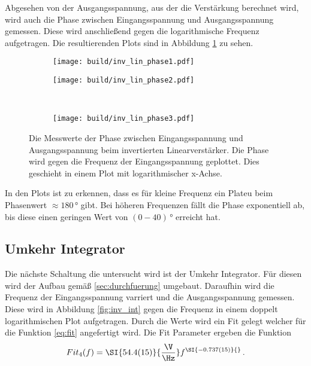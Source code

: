 Abgesehen von der Ausgangsspannung, aus der die Verstärkung berechnet wird, wird auch die Phase zwischen Eingangsspannung und Ausgangsspannung gemessen.
Diese wird anschließend gegen die logarithmische  Frequenz aufgetragen.
Die resultierenden Plots sind in Abbildung \ref{fig:phase} zu sehen.
\begin{figure}
    \centering
    \begin{subfigure}{0.49\linewidth}%
        \texttt{[image: build/inv\_lin\_phase1.pdf]}
    \end{subfigure}
    \hfill
    \begin{subfigure}{0.49\linewidth}%
        \texttt{[image: build/inv\_lin\_phase2.pdf]}
    \end{subfigure}\\
    \begin{subfigure}{0.49\linewidth}%
        \texttt{[image: build/inv\_lin\_phase3.pdf]}
    \end{subfigure}
    \caption{Die Messwerte der Phase zwischen Eingangsspannung und Ausgangsspannung beim invertierten Linearverstärker. Die Phase wird gegen die Frequenz der Eingangsspannung geplottet.
    Dies geschieht in einem Plot mit logarithmischer x-Achse.}
    \label{fig:phase}
\end{figure}
In den Plots ist zu erkennen, dass es für kleine Frequenz ein Plateu beim Phasenwert $\approx 180\,\si{\degree}$ gibt.
Bei höheren Frequenzen fällt die Phase exponentiell ab, bis diese einen geringen Wert von $(0-40)\,\si{\degree}$ erreicht hat.
\FloatBarrier
\subsection{Umkehr Integrator}
Die nächste Schaltung die untersucht wird ist der Umkehr Integrator.
Für diesen wird der Aufbau gemäß \ref{sec:durchfuerung} umgebaut.
Daraufhin wird die Frequenz der Eingangsspannung varriert und die Ausgangsspannung gemessen.
Diese wird in Abbildung \ref{fig:inv_int} gegen die Frequenz in einem doppelt logarithmischen Plot aufgetragen.
Durch die Werte wird ein Fit gelegt welcher für die Funktion \eqref{eq:fit} angefertigt wird.
Die Fit Parameter ergeben die Funktion
\begin{align*}
    Fit_4(f) = \SI{54.4(15)}{\frac{\V}{\Hz}} f^{\SI{-0.737(15)}{}} \, .
\end{align*}

